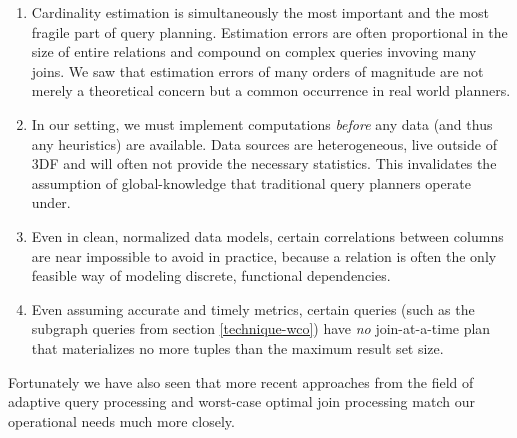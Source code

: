\documentclass[../index.tex]{subfiles}
\begin{document}
\begin{enumerate}
  \item
    Cardinality estimation is simultaneously the most important and
    the most fragile part of query planning. Estimation errors are
    often proportional in the size of entire relations and compound on
    complex queries invoving many joins. We saw that estimation errors
    of many orders of magnitude are not merely a theoretical concern
    but a common occurrence in real world planners.

  \item
    In our setting, we must implement computations \emph{before} any
    data (and thus any heuristics) are available. Data sources are
    heterogeneous, live outside of 3DF and will often not provide the
    necessary statistics. This invalidates the assumption of
    global-knowledge that traditional query planners operate under.

  \item
    Even in clean, normalized data models, certain correlations
    between columns are near impossible to avoid in practice, because
    a relation is often the only feasible way of modeling discrete,
    functional dependencies.

  \item
    Even assuming accurate and timely metrics, certain queries (such
    as the subgraph queries from section \ref{technique-wco}) have
    \emph{no} join-at-a-time plan that materializes no more tuples
    than the maximum result set size.
\end{enumerate}

Fortunately we have also seen that more recent approaches from the
field of adaptive query processing and worst-case optimal join
processing match our operational needs much more closely.
\end{document}
